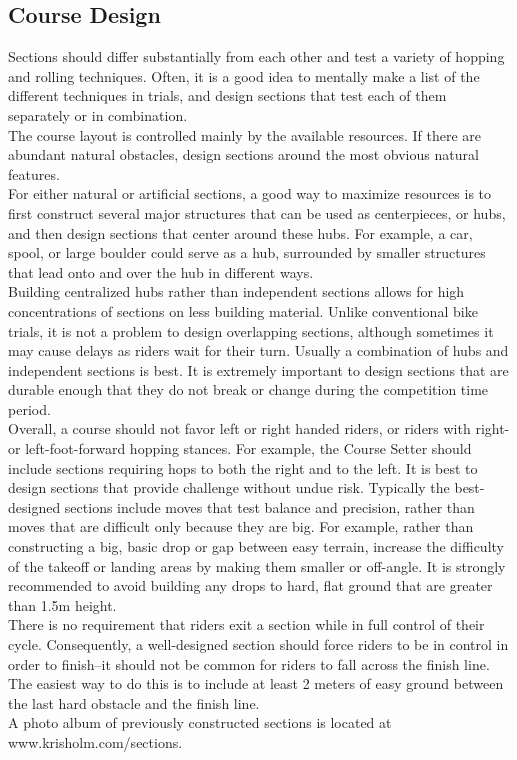 \subsection{Course Design}
Sections should differ substantially from each other and test a variety of hopping and rolling techniques. Often, it is a
good idea to mentally make a list of the different techniques in trials, and design sections that test each of them
separately or in combination.\\
The course layout is controlled mainly by the available resources. If there are abundant natural obstacles, design
sections around the most obvious natural features.\\
For either natural or artificial sections, a good way to maximize resources is to first construct several major structures
that can be used as centerpieces, or hubs, and then design sections that center around these hubs. For example, a car,
spool, or large boulder could serve as a hub, surrounded by smaller structures that lead onto and over the hub in
different ways.\\
Building centralized hubs rather than independent sections allows for high concentrations of sections on less building
material. Unlike conventional bike trials, it is not a problem to design overlapping sections, although sometimes it may
cause delays as riders wait for their turn. Usually a combination of hubs and independent sections is best.
It is extremely important to design sections that are durable enough that they do not break or change during the
competition time period.\\
Overall, a course should not favor left or right handed riders, or riders with right- or left-foot-forward hopping stances.
For example, the Course Setter should include sections requiring hops to both the right and to the left.
It is best to design sections that provide challenge without undue risk. Typically the best-designed sections include
moves that test balance and precision, rather than moves that are difficult only because they are big. For example,
rather than constructing a big, basic drop or gap between easy terrain, increase the difficulty of the takeoff or landing
areas by making them smaller or off-angle. It is strongly recommended to avoid building any drops to hard, flat ground
that are greater than 1.5m height.\\
There is no requirement that riders exit a section while in full control of their cycle. Consequently, a well-designed
section should force riders to be in control in order to finish--it should not be common for riders to fall across the finish
line. The easiest way to do this is to include at least 2 meters of easy ground between the last hard obstacle and the
finish line.\\
A photo album of previously constructed sections is located at www.krisholm.com/sections.
